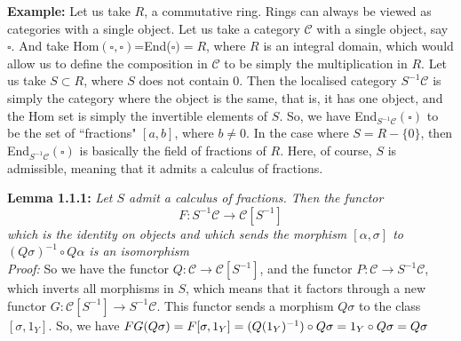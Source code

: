 \documentclass[12pt]{article}
\newcommand{\cat}[1]{\mathscr{#1}}
\begin{document}
\textbf{Example: } Let us take $R$, a commutative ring. Rings can always be viewed as categories with a single object. Let us take a category $\cat{C}$ with a single object, say $\square$. And take Hom$(\square,\square)$=End($\square)=R$, where $R$ is an integral domain, which would allow us to define the composition in $\cat{C}$ to be simply the multiplication in $R$. Let us take $S\subset R$, where $S$ does not contain 0. Then the localised category $S^{-1}\cat{C}$ is simply the category where the object is the same, that is, it has one object, and the Hom set is simply the invertible elements of $S$. So, we have End$_{S^{-1}\cat{C}}(\square)$ to be the set of ``fractions" $[a,b]$, where $b\neq0$. In the case where $S=R -\{0\}$, then End$_{S^{-1}\cat{C}}(\square)$ is basically the field of fractions of $R$. Here, of course, $S$ is admissible, meaning that it admits a calculus of fractions.

 \textbf{Lemma 1.1.1: } \textit{Let $S$ admit a calculus of fractions. Then the functor
 \[
 F: S^{-1}\cat{C} \to \cat{C}[S^{-1}]
 \]
 which is the identity on objects and which sends the morphism $[\alpha,\sigma]$ to $(Q\sigma)^{-1} \circ Q\alpha$ is an isomorphism}\\

 \textit{Proof: }So we have the functor $Q:\cat{C} \to \cat{C}[S^{-1}]$, and the functor $P: \cat{C}\to S^{-1}\cat{C}$, which inverts all morphisms in $S$, which means that it factors through a new functor $G:\cat{C}[S^{-1}] \to S^{-1}\cat{C}$. This functor sends a morphism $Q\sigma$ to the class $[\sigma,1_Y]$. So, we have $FG(Q\sigma)=F[\sigma,1_Y]=(Q(1_Y)^{-1})\circ Q\sigma=\\1_Y\circ Q\sigma=Q\sigma$
 
 
\newpage
\end{document}
